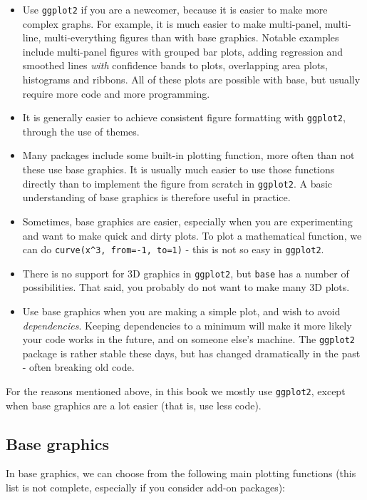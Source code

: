 \documentclass[]{book}
\providecommand{\tightlist}{%
  \setlength{\itemsep}{0pt}\setlength{\parskip}{0pt}}
\begin{document}
\begin{itemize}
\tightlist
\item
  Use \texttt{ggplot2} if you are a newcomer, because it is easier to make more complex graphs. For example, it is much easier to make multi-panel, multi-line, multi-everything figures than with base graphics. Notable examples include multi-panel figures with grouped bar plots, adding regression and smoothed lines \emph{with} confidence bands to plots, overlapping area plots, histograms and ribbons. All of these plots are possible with base, but usually require more code and more programming.
\item
  It is generally easier to achieve consistent figure formatting with \texttt{ggplot2}, through the use of themes.
\item
  Many packages include some built-in plotting function, more often than not these use base graphics. It is usually much easier to use those functions directly than to implement the figure from scratch in \texttt{ggplot2}. A basic understanding of base graphics is therefore useful in practice.
\item
  Sometimes, base graphics are easier, especially when you are experimenting and want to make quick and dirty plots. To plot a mathematical function, we can do \texttt{curve(x\^{}3,\ from=-1,\ to=1)} - this is not so easy in \texttt{ggplot2}.
\item
  There is no support for 3D graphics in \texttt{ggplot2}, but \texttt{base} has a number of possibilities. That said, you probably do not want to make many 3D plots.
\item
  Use base graphics when you are making a simple plot, and wish to avoid \emph{dependencies}. Keeping dependencies to a minimum will make it more likely your code works in the future, and on someone else's machine. The \texttt{ggplot2} package is rather stable these days, but has changed dramatically in the past - often breaking old code.
\end{itemize}

For the reasons mentioned above, in this book we mostly use \texttt{ggplot2}, except when base graphics are a lot easier (that is, use less code).

\hypertarget{base-graphics}{%
\subsection{Base graphics}\label{base-graphics}}

In base graphics, we can choose from the following main plotting functions (this list is not complete, especially if you consider add-on packages):
\end{document}
